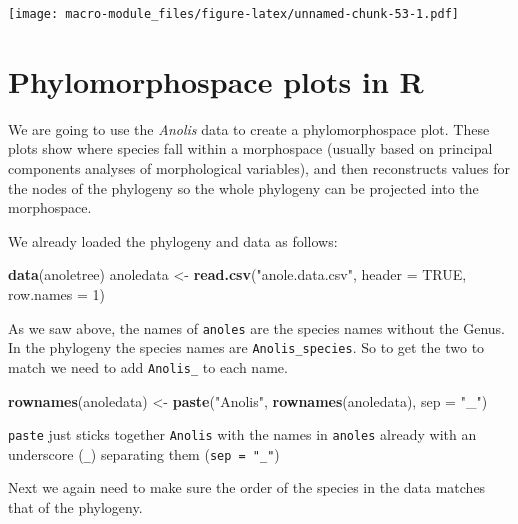 \documentclass[]{book}
\newenvironment{Shaded}{\begin{snugshade}}{\end{snugshade}}
\newcommand{\KeywordTok}[1]{\textcolor[rgb]{0.13,0.29,0.53}{\textbf{{#1}}}}
\newcommand{\DataTypeTok}[1]{\textcolor[rgb]{0.13,0.29,0.53}{{#1}}}
\newcommand{\DecValTok}[1]{\textcolor[rgb]{0.00,0.00,0.81}{{#1}}}
\newcommand{\StringTok}[1]{\textcolor[rgb]{0.31,0.60,0.02}{{#1}}}
\newcommand{\OtherTok}[1]{\textcolor[rgb]{0.56,0.35,0.01}{{#1}}}
\newcommand{\NormalTok}[1]{{#1}}
\begin{document}
\texttt{[image: macro-module\_files/figure-latex/unnamed-chunk-53-1.pdf]}

\section{Phylomorphospace plots in R}\label{phylomorphospace-plots-in-r}

We are going to use the \emph{Anolis} data to create a phylomorphospace
plot. These plots show where species fall within a morphospace (usually
based on principal components analyses of morphological variables), and
then reconstructs values for the nodes of the phylogeny so the whole
phylogeny can be projected into the morphospace.

We already loaded the phylogeny and data as follows:

\begin{Shaded}
\begin{Highlighting}[]
\KeywordTok{data}\NormalTok{(anoletree)}
\NormalTok{anoledata <-}\StringTok{ }\KeywordTok{read.csv}\NormalTok{(}\StringTok{"anole.data.csv"}\NormalTok{, }\DataTypeTok{header =} \OtherTok{TRUE}\NormalTok{, }\DataTypeTok{row.names =} \DecValTok{1}\NormalTok{)}
\end{Highlighting}
\end{Shaded}

As we saw above, the names of \texttt{anoles} are the species names
without the Genus. In the phylogeny the species names are
\texttt{Anolis\_species}. So to get the two to match we need to add
\texttt{Anolis\_} to each name.

\begin{Shaded}
\begin{Highlighting}[]
\KeywordTok{rownames}\NormalTok{(anoledata) <-}\StringTok{ }\KeywordTok{paste}\NormalTok{(}\StringTok{"Anolis"}\NormalTok{, }\KeywordTok{rownames}\NormalTok{(anoledata), }\DataTypeTok{sep =} \StringTok{"_"}\NormalTok{)}
\end{Highlighting}
\end{Shaded}

\texttt{paste} just sticks together \texttt{Anolis} with the names in
\texttt{anoles} already with an underscore (\texttt{\_}) separating them
(\texttt{sep\ =\ "\_"})

Next we again need to make sure the order of the species in the data
matches that of the phylogeny.

\begin{Shaded}
\end{Shaded}
\end{document}
